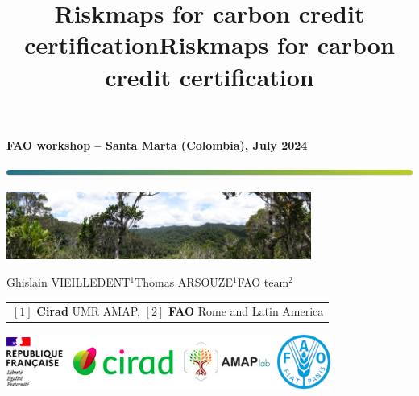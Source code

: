 \documentclass[10pt,table,dvipsnames,compress]{beamer}
\date{}
\title{Riskmaps for carbon credit certification}
\title[riskmaps]{Riskmaps for carbon credit certification}
\begin{document}

{
  \begin{frame}
  \begin{center}
  \small{\textbf{FAO workshop -- Santa Marta (Colombia), July 2024}}
  \end{center}
  \vspace{-0.5cm}
  \titlepage %
  \vspace{-3cm}
  \begin{center}
    \includegraphics[width=\textwidth]{figs/Barre_couleur}
    
    \vspace{0.25cm}
    
    \includegraphics[width=10cm]{figs/Banniere}
    
    \small{Ghislain VIEILLEDENT$^{1}$\hspace{0.25cm}Thomas ARSOUZE$^{1}$\hspace{0.25cm}FAO team$^{2}$}
      
    \vspace{0.25cm}
    
    {\scriptsize
      \begin{tabular}{l}
        $[1]$ \textbf{Cirad} UMR AMAP, $[2]$ \textbf{FAO} Rome and Latin America
      \end{tabular}
    }
    
    \includegraphics[width=0.8\textwidth]{figs/partners_logos}
    
  \end{center}
  \end{frame}
}
\end{document}
